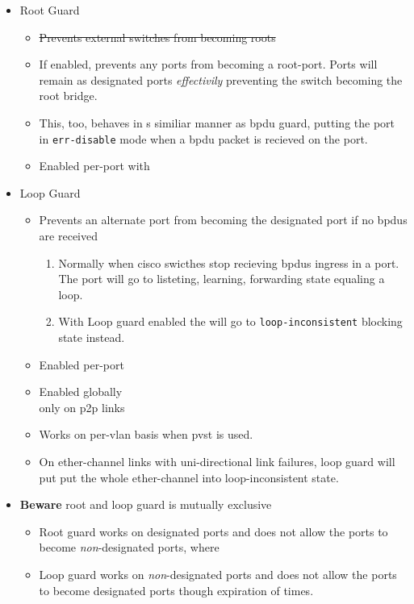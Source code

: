 \begin{itemize}
\begin{itemize}
        \item Beware to \underline{only enable either} \gls{bpdu} guard \textbf{\textit{or}} filter. \footnote{Cisco recommendation}
    \end{itemize}
    \item Root Guard
    \begin{itemize}
        \item \st{Prevents external switches from becoming roots}
        \item If enabled, prevents any ports from becoming a root-port. Ports will remain as designated ports \textit{effectivily} preventing the switch becoming the root bridge.
        \item This, too, behaves in s similiar manner as \gls{bpdu} guard, putting the port in \texttt{err-disable} mode when a \gls{bpdu} packet is recieved on the port.
        \item Enabled per-port with\\
    \end{itemize}
    \item Loop Guard
    \begin{itemize}
        \item Prevents an alternate port from becoming the designated port if no \gls{bpdu}s are received
        \begin{enumerate}
            \item Normally when cisco swicthes stop recieving \gls{bpdu}s ingress in a port. The port will go to listeting, learning, forwarding state equaling a loop.
            \item With Loop guard enabled the will go to \texttt{loop-inconsistent} blocking state instead.
        \end{enumerate}
        \item Enabled per-port\\
        \item Enabled globally\\ {\small only on p2p links}
        \item Works on per-vlan basis when \gls{pvst} is used.
        \item On ether-channel links with uni-directional link failures, loop guard will put put the whole ether-channel into loop-inconsistent state.
    \end{itemize}
    \item \textbf{Beware} root and loop guard is mutually exclusive
    \begin{itemize}
        \item Root guard works on designated ports and does not allow the ports to become \textit{non}-designated ports, where
        \item Loop guard works on \textit{non}-designated ports and does not allow the ports to become designated ports {\footnotesize though expiration of times}.
    \end{itemize}
\end{itemize}

